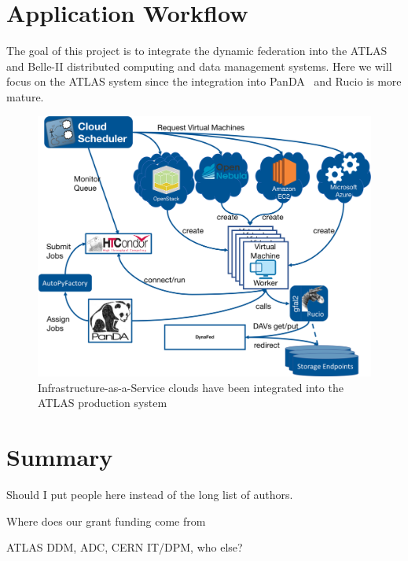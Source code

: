 \documentclass[a4paper]{jpconf}
\begin{document}
\section{Application Workflow}
The goal of this project is to integrate the dynamic federation into the ATLAS and Belle-II distributed computing and data management systems. Here we will focus on the ATLAS system since the integration into PanDA~\cite{panda} and Rucio is more mature.

\begin{figure}
  \includegraphics[width=\textwidth]{atlas-cloud-system.png}
  \caption{Infrastructure-as-a-Service clouds have been integrated into the ATLAS production system }
  \label{fig:atlas-cloud}
\end{figure}


\section{Summary}


\ack
Should I put people here instead of the long list of authors.

Where does our grant funding come from

ATLAS DDM, ADC, CERN IT/DPM, who else?
\end{document}
